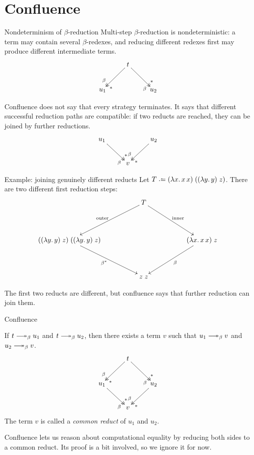 \section{Confluence}

\begin{frame}{Nondeterminism of $\beta$-reduction}
  Multi-step $\beta$-reduction is nondeterministic: a term may contain several
  $\beta$-redexes, and reducing different redexes first may produce different
  intermediate terms.
    \[
      \xymatrix{
        & t \ar@{->>}[rd]^(.8){*}_(.8){\beta}
            \ar@{->>}[ld]^(.8){*}_(.8){\beta} \\
        u_1 & & u_2
      }
    \]

  Confluence does not say that every strategy terminates.
  It says that different successful reduction paths are compatible: if two
  reducts are reached, they can be joined by further reductions.
  \[
      \xymatrix{
        u_1 \ar@{->>}[rd]^(.8){*}_(.8){\beta}
          & & u_2 \ar@{->>}[ld]^(.8){*}_(.8){\beta} \\
        & v
      }
    \]
\end{frame}

\begin{frame}{Example: joining genuinely different reducts}
  Let $T \defeq (\lambda x.\,x\,x)\;((\lambda y.\,y)\;z)$.
  There are two different first reduction steps:
  \[
    \xymatrix@C=5em@R=4em{
      & T
        \ar[dl]_{\text{outer}}
        \ar[dr]^{\text{inner}}
      & \\
      {((\lambda y.\,y)\;z)\;((\lambda y.\,y)\;z)}
        \ar[dr]_{\beta^*}
      &&
      {(\lambda x.\,x\,x)\;z}
        \ar[dl]^{\beta} \\
      &
      {z\;z}
      &
    }
  \]

  The first two reducts are different, but confluence says that
  further reduction can join them.
\end{frame}

\begin{frame}{Confluence}
  \begin{theorem}[Confluence]
    If $t \reduce u_1$ and $t \reduce u_2$, then there exists a term $v$ such
    that $u_1 \reduce v$ and $u_2 \reduce v$.
    \[
      \xymatrix{
        & t \ar@{->>}[rd]^(.8){*}_(.8){\beta}
            \ar@{->>}[ld]^(.8){*}_(.8){\beta} \\
        u_1 \ar@{->>}[rd]^(.8){*}_(.8){\beta}
          & & u_2 \ar@{->>}[ld]^(.8){*}_(.8){\beta} \\
        & v
      }
    \]
    The term $v$ is called a \emph{common reduct} of $u_1$ and $u_2$.
  \end{theorem}

  \vfill

  Confluence lets us reason about computational equality by reducing both sides
  to a common reduct.
  Its proof is a bit involved, so we ignore it for now.
\end{frame}


